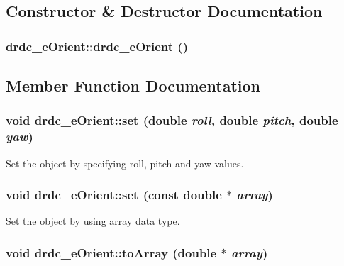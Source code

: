 \subsection{Constructor \& Destructor Documentation}
\hypertarget{classdrdc__eOrient_c14573d35fe035bb2416bff9d1ed9415}{
\subsubsection[drdc\_\-eOrient]{\setlength{\rightskip}{0pt plus 5cm}drdc\_\-eOrient::drdc\_\-eOrient ()}}
\label{classdrdc__eOrient_c14573d35fe035bb2416bff9d1ed9415}




\subsection{Member Function Documentation}
\hypertarget{classdrdc__eOrient_61d95b384837cbdbbbef12cea797836c}{
\subsubsection[set]{\setlength{\rightskip}{0pt plus 5cm}void drdc\_\-eOrient::set (double {\em roll}, \/  double {\em pitch}, \/  double {\em yaw})}}
\label{classdrdc__eOrient_61d95b384837cbdbbbef12cea797836c}


Set the object by specifying roll, pitch and yaw values. 

\hypertarget{classdrdc__eOrient_e7d394328dd13bee772409963493428c}{
\subsubsection[set]{\setlength{\rightskip}{0pt plus 5cm}void drdc\_\-eOrient::set (const double $\ast$ {\em array})}}
\label{classdrdc__eOrient_e7d394328dd13bee772409963493428c}


Set the object by using array data type. 

\hypertarget{classdrdc__eOrient_71f23a163c4c273417c68d4ffe8cb46f}{
\subsubsection[toArray]{\setlength{\rightskip}{0pt plus 5cm}void drdc\_\-eOrient::toArray (double $\ast$ {\em array})}}
\label{classdrdc__eOrient_71f23a163c4c273417c68d4ffe8cb46f}


